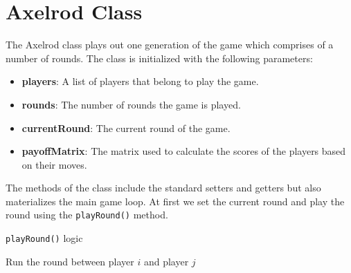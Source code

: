 \documentclass[12pt]{report}
\begin{document}
\section{Axelrod Class}
The Axelrod class plays out one generation of the game which comprises of a number of rounds. The class is initialized with the following parameters:
\begin{itemize}
    \item \textbf{players}: A list of players that belong to  play the game.
    \item \textbf{rounds}: The number of rounds the game is played.
    \item \textbf{currentRound}: The current round of the game.
    \item \textbf{payoffMatrix}: The matrix used to calculate the scores of the players based on their moves.
\end{itemize}
The methods of the class include the standard setters and getters but also materializes the main game loop. At first we set the current round and play the round using the \texttt{playRound()} method.
\begin{algorithm}
\caption{\texttt{playRound()} logic}
\begin{algorithmic}
      \State Run the round between player $i$ and player $j$
    \EndFor
  \EndFor
\EndFunction
\end{algorithmic}
\end{algorithm}
\end{document}
